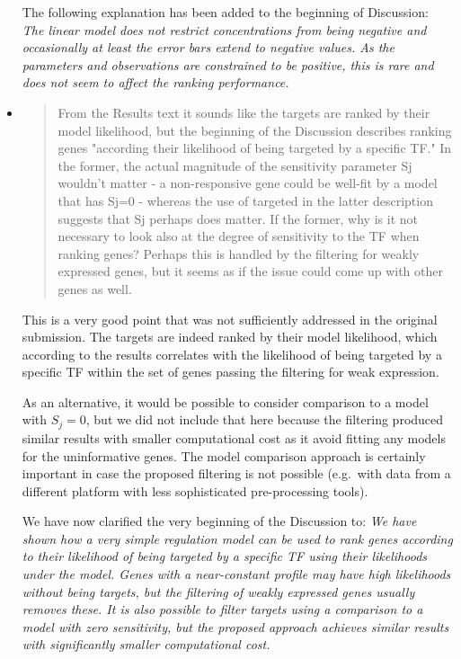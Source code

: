 \documentclass{article}
\begin{document}
\begin{itemize}
The following explanation has been added to the beginning of Discussion:
\emph{The linear model does not restrict concentrations from being negative
and occasionally at least the error bars extend to negative values.
As the parameters and observations are constrained to be positive,
this is rare and does not seem to affect the ranking performance.}

\item \begin{quote} From the Results text it sounds like the targets
    are ranked by their model likelihood, but the beginning of the
    Discussion describes ranking genes "according their likelihood of
    being targeted by a specific TF." In the former, the actual
    magnitude of the sensitivity parameter Sj wouldn't matter - a
    non-responsive gene could be well-fit by a model that has Sj=0 -
    whereas the use of targeted in the latter description suggests
    that Sj perhaps does matter. If the former, why is it not
    necessary to look also at the degree of sensitivity to the TF when
    ranking genes? Perhaps this is handled by the filtering for weakly
    expressed genes, but it seems as if the issue could come up with
    other genes as well.
\end{quote}

This is a very good point that was not sufficiently addressed in the
original submission.  The targets are indeed ranked by their model
likelihood, which according to the results correlates with the
likelihood of being targeted by a specific TF within the set of
genes passing the filtering for weak expression.

As an alternative, it would be possible to consider comparison to a
model with $S_j = 0$, but we did not include that here because the
filtering produced similar results with smaller computational cost as
it avoid fitting any models for the uninformative genes.  The model
comparison approach is certainly important in case the proposed
filtering is not possible (e.g.\ with data from a different platform
with less sophisticated pre-processing tools).

We have now clarified the very beginning of the Discussion to:
\emph{We have shown how a very simple regulation model can be used to rank
genes according to their likelihood of being targeted by a specific
TF using their likelihoods under the model.  Genes with a
near-constant profile may have high likelihoods without being targets,
but the filtering of weakly expressed genes usually removes these.  It
is also possible to filter targets using a comparison to a model with
zero sensitivity, but the proposed approach achieves similar results
with significantly smaller computational cost.}

\end{itemize}
\end{document}
